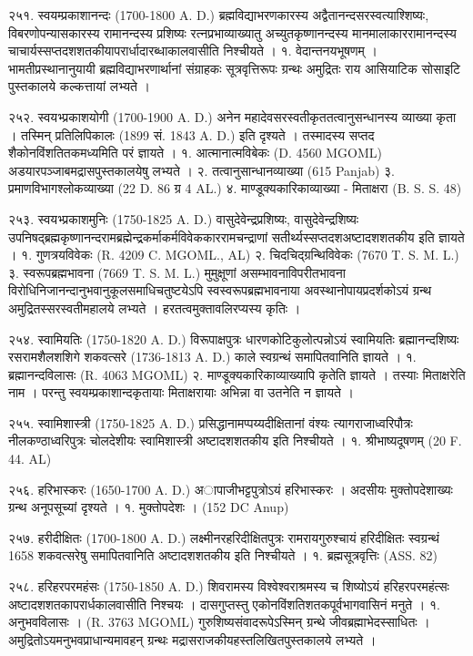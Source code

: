 २५१. स्वयम्प्रकाशानन्दः (1700-1800 A. D.)
ब्रह्मविद्याभरणकारस्य अद्वैतानन्दसरस्वत्याश्शिष्यः, विबरणोपन्यासकारस्य रामानन्दस्य प्रशिष्यः रत्नप्रभाव्याख्यातु अच्युतकृष्णानन्दस्य मानमालाकाररामानन्दस्य चाचार्यस्सप्तदशशतकीयापरार्धादारब्धाकालवासीति निश्चीयते ।
१. वेदान्तनयभूषणम् । भामतीप्रस्थानानुयायी ब्रह्मविद्याभरणार्थानां संग्राहकः सूत्रवृत्तिरूपः ग्रन्थः अमुद्रितः राय आसियाटिक सोसाइटि पुस्तकालये कल्कत्तायां लभ्यते ।

२५२. स्वयभ्प्रकाशयोगी (1700-1900 A. D.)
अनेन महादेवसरस्वतीकृततत्वानुसन्धानस्य व्याख्या कृता । तस्मिन् प्रतिलिपिकालः (1899 सं. 1843 A. D.) इति दृश्यते । तस्मादस्य सप्तद शैकोनविंशतितकमध्यमिति परं ज्ञायते ।
१. आत्मानात्मविबेकः (D. 4560 MGOML) अडयारपञ्जाबमद्रासपुस्तकालयेषु लभ्यते ।
२. तत्वानुसान्धानव्याख्या (615 Panjab)
३. प्रमाणविभागश्लोकव्याख्या (22 D. 86 ग्र 4 AL.)
४. माण्डूक्यकारिकाव्याख्या - मिताक्षरा (B. S. S. 48)

२५३. स्वयभ्प्रकाशमुनिः (1750-1825 A. D.)
वासुदेवेन्द्रप्रशिष्यः, वासुदेवेन्द्रशिष्यः उपनिषद्ब्रह्मकृष्णानन्दरामब्रह्मेन्द्रकर्माकर्मविवेककाररामचन्द्राणां सतीर्थ्यस्सप्तदशअष्टादशशतकीय इति ज्ञायते ।
१. गुणत्रयविवेकः (R. 4209 C. MGOML., AL)
२. चिदचिद्ग्रन्थिविवेकः (7670 T. S. M. L.)
३. स्वरूपब्रह्मभावना (7669 T. S. M. L.) मुमुक्षूणां असम्भावनाविपरीतभावना विरोधिनिजानन्दानुभवानुकूलसमाधिचतुष्टयेऽपि स्वस्वरूपब्रह्मभावनाया अवस्थानोपायप्रदर्शकोऽयं ग्रन्थ अमुद्रितस्सरस्वतीमहालये लभ्यते । हरतत्वमुक्तावलिरप्यस्य कृतिः ।

२५४. स्वामियतिः (1750-1820 A. D.)
विरूपाक्षपुत्रः धारणकोटिकुलोत्पन्नोऽयं स्वामियतिः ब्रह्मानन्दशिष्यः रसरामशैलशशिगे शकवत्सरे (1736-1813 A. D.) काले स्वग्रन्थं समापितवानिति ज्ञायते ।
१. ब्रह्मानन्दविलासः (R. 4063 MGOML)
२. माण्डूक्यकारिकाव्याख्यापि कृतेति ज्ञायते । तस्याः मिताक्षरेति नाम । परन्तु स्वयम्प्रकाशान्दकृतायाः मिताक्षरायाः अभिन्ना वा उतनेति न ज्ञायते ।

२५५. स्वामिशास्त्री (1750-1825 A. D.)
प्रसिद्धानामप्पय्यदीक्षितानां वंश्यः त्यागराजाध्वरिपौत्रः नीलकण्ठाध्वरिपुत्रः चोलदेशीयः स्वामिशास्त्री अष्टादशशतकीय इति निश्चीयते ।
१. श्रीभाष्यदूषणम् (20 F. 44. AL)

२५६. हरिभास्करः (1650-1700 A. D.)
अापाजीभट्टपुत्रोऽयं हरिभास्करः । अदसीयः मुक्तोपदेशाख्यः ग्रन्थ अनूपसूच्यां दृश्यते ।
१. मुक्तोपदेशः । (152 DC Anup)

२५७. हरीदीक्षितः (1700-1800 A. D.)
लक्ष्मीनरहरिदीक्षितपुत्रः रामरायगुरुश्चायं हरिदीक्षितः स्वग्रन्थं 1658 शकवत्सरेषु समापितवानिति अष्टादशशतकीय इति निश्चीयते ।
१. ब्रह्मसूत्रवृत्तिः (ASS. 82)

२५८. हरिहरपरमहंसः (1750-1850 A. D.)
शिवरामस्य विश्वेश्वराश्रमस्य च शिष्योऽयं हरिहरपरमहंत्सः अष्टादशशतकापरार्धकालवासीति निश्चयः । दासगुप्तस्तु एकोनविंशतिशतकपूर्वभागवासिनं मनुते ।
१. अनुभवविलासः । (R. 3763 MGOML) गुरुशिष्यसंवादरूपेऽस्मिन् ग्रन्थे जीवब्रह्माभेदस्साधितः । अमुद्रितोऽयमनुभवप्राधान्यमावहन् ग्रन्थः मद्रासराजकीयहस्तलिखितपुस्तकालये लभ्यते ।

